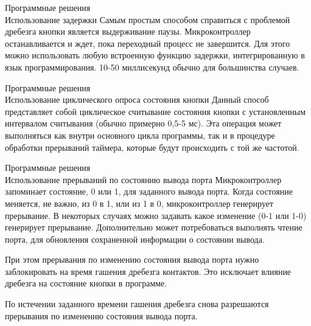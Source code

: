 \documentclass[12pt,a4paper,mathserif]{beamer}
\begin{document}
\begin{frame}{Программные решения\\Использование задержки}
    \setlength{\parindent}{0.5cm}
    Самым простым способом справиться с проблемой дребезга кнопки является выдерживание паузы. Микроконтроллер останавливается и ждет, пока переходный процесс не завершится. Для этого можно использовать любую встроенную функцию задержки, интегрированную в язык программирования. 10-50 миллисекунд обычно для большинства случаев.
\end{frame}

\begin{frame}{Программные решения\\Использование циклического опроса состояния кнопки}
    \setlength{\parindent}{0.5cm}
    Данный способ представляет собой циклическое считывание состояния кнопки с установленным интервалом считывания (обычно примерно 0,5-5 мс). Эта операция может выполняться как внутри основного цикла программы, так и в процедуре обработки прерываний таймера, которые будут происходить с той же частотой.
\end{frame}

\begin{frame}{Программные решения\\Использование прерываний по состоянию вывода порта}
    \setlength{\parindent}{0.5cm}
    Микроконтроллер запоминает состояние, 0 или 1, для заданного вывода порта. Когда состояние меняется, не важно, из 0 в 1, или из 1 в 0, микроконтроллер генерирует прерывание. В некоторых случаях можно задавать какое изменение (0-1 или 1-0) генерирует прерывание. Дополнительно может потребоваться выполнять чтение порта, для обновления сохраненной информации о состоянии вывода.
    
    При этом прерывания по изменению состояния вывода порта нужно заблокировать на время гашения дребезга контактов. Это исключает влияние дребезга на состояние кнопки в программе.
    
    По истечении заданного времени гашения дребезга снова разрешаются прерывания по изменению состояния вывода порта.
\end{frame}
\end{document}
